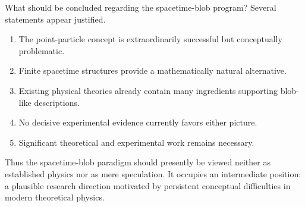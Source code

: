 What should be concluded regarding the spacetime-blob program?
Several statements appear justified.
\begin{enumerate}
\item The point-particle concept is extraordinarily successful but
conceptually problematic.
\item Finite spacetime structures provide a mathematically natural
alternative.
\item Existing physical theories already contain many ingredients
supporting blob-like descriptions.
\item No decisive experimental evidence currently favors either picture.
\item Significant theoretical and experimental work remains necessary.
\end{enumerate}
Thus the spacetime-blob paradigm should presently be viewed neither as
established physics nor as mere speculation. It occupies an intermediate
position: a plausible research direction motivated by persistent
conceptual difficulties in modern theoretical physics.


